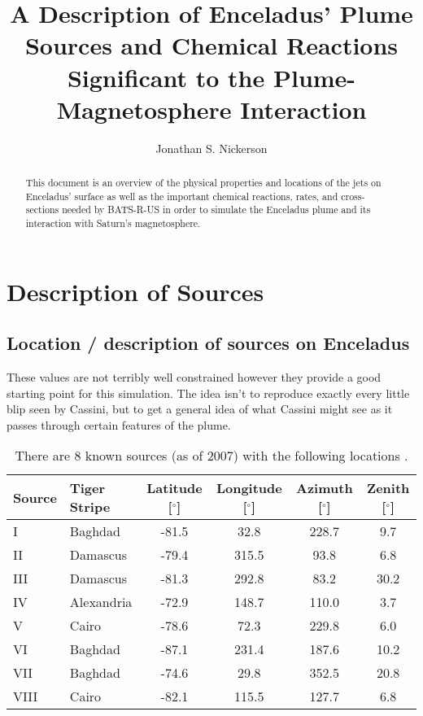 \documentclass[12pt, letterpaper]{article}
\newcommand{\degree}{\ensuremath{^\circ}}
\begin{document}
\title{A Description of Enceladus' Plume Sources and Chemical Reactions Significant to the Plume-Magnetosphere Interaction}
\author{Jonathan S. Nickerson}
\date{}

\maketitle
\newpage
\tableofcontents
\newpage

\begin{abstract}
This document is an overview of the physical properties and locations of the jets on Enceladus' surface as well as the important chemical reactions, rates, and cross-sections needed by BATS-R-US in order to simulate the Enceladus plume and its interaction with Saturn's magnetosphere.
\end{abstract}

\section{Description of Sources}
\label{sec:1}

\subsection{Location / description of sources on Enceladus}
These values are not terribly well constrained however they provide a good starting point for this simulation. The idea isn't to reproduce exactly every little blip seen by Cassini, but to get a general idea of what Cassini might see as it passes through certain features of the plume.

\renewcommand{\arraystretch}{1.5}
\begin{table}[h!]
\centering
\label{label 1}
\caption{There are 8 known sources (as of 2007) with the following locations \citep{Spitale07}.}
\begin{tabular}[l]{ l l c c c c }
\hline
Source & Tiger Stripe & Latitude [\degree] & Longitude [\degree] & Azimuth [\degree] & Zenith [\degree] \\
\hline
\hline
I & Baghdad & -81.5 & 32.8 & 228.7 & 9.7 \\ 
II & Damascus & -79.4 & 315.5 & 93.8 & 6.8 \\
III & Damascus & -81.3 & 292.8 & 83.2 & 30.2 \\
IV & Alexandria & -72.9 & 148.7 & 110.0 & 3.7 \\ 
V & Cairo & -78.6 & 72.3 & 229.8 & 6.0 \\
VI & Baghdad & -87.1 & 231.4 & 187.6 & 10.2 \\
VII & Baghdad & -74.6 & 29.8 & 352.5 & 20.8 \\ 
VIII & Cairo & -82.1 & 115.5 & 127.7 & 6.8 \\
\end{tabular}
\end{table}
\end{document}
